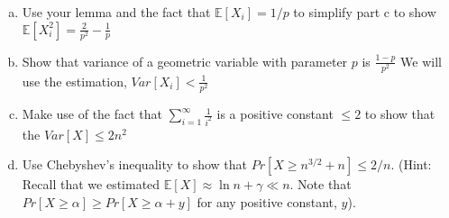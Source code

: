 \documentclass[11pt]{article}
\newif\ifsolutions
\begin{document}
\begin{enumerate}
\begin{enumerate}[a)]
\ifsolutions{\color{blue}{
By definition $\mathbb{E}[X_i^2] = \sum\nolimits_{k=1}^{\infty} k^2p(1-p)^{k-1}$ since $k^2 = k(k+1) - k$ we plug that in to get the answer 
}}\fi



\item Use your lemma and the fact that $\mathbb{E}[X_i] = 1/p$ to simplify part c to show $\mathbb{E}[X_i^2] = \frac{2}{p^2} - \frac{1}{p} $
\ifsolutions{\color{blue}{
We simply plug in our lemma to the left hand term. We also notice that the right hand expression is the expectation of a geometric variable with parameter $p$.
}}\fi
\item Show that variance of a geometric variable with parameter $p$ is $\frac{1-p}{p^2}$ We will use the estimation, $Var[X_i] < \frac{1}{p^2}$
\ifsolutions{\color{blue}{
$Var[X] = \mathbb{E}[X^2] - \mathbb{E}[X]^2$ \\ $Var[X_i] = \frac{2}{p^2} - \frac{1}{p}  - \frac{1}{p}^2 = 1/p^2 - 1/p = \frac{1-p}{p^2} < \frac{1}{p^2}$
}}\fi
\item Make use of the fact that $\sum\nolimits_{i=1}^{\infty} \frac{1}{i^2}$ is a positive constant $\leq2$ to show that the $Var[X] \leq 2n^2$ 

\ifsolutions{\color{blue}{
We use the fact that since the $X_i$ are independent, \\ $Var[X] = \sum\nolimits_{i=0}^{n-1} Var[X_i]$ \\ $ \leq \sum\nolimits_{i=0}^{n-1} (\frac{n}{n-i})^2 = n^2\sum\nolimits_{i=0}^{n-1} \frac{1}{i}^2 \leq n^2\sum\nolimits_{i=0}^{\infty} \frac{1}{i}^2 \leq 2n^2$
}}\fi
\item Use Chebyshev's inequality to show that $Pr[ X \geq n^{3/2} + n] \leq 2/n $. (Hint: Recall that we estimated $\mathbb{E}[X] \approx \ln{n} + \gamma \ll n$. Note that $Pr[X \geq \alpha] \geq Pr[X \geq \alpha + y]$ for any positive constant, $y$).

\ifsolutions{\color{blue}{
$n^{3/2} + n > n^{3/2} + \mathbb{E}[X]$ so \\ $Pr[ X \geq n^{3/2} + n] \leq Pr[ X \geq n^{3/2} + \mathbb{E}[X]] \\ =  Pr[ X - \mathbb{E}[X] \geq n^{3/2} ] \leq Pr[ | X - \mathbb{E}[X] | \geq n^{3/2} ] \leq \frac{Var[X]}{n^3} \leq \frac{2n^2}{n^3} = 2/n$
}}\fi


\end{enumerate}


\end{enumerate}
\end{document}
